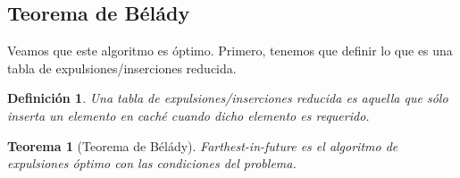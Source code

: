 \documentclass[a4paper, 11pt]{article} %
\newtheorem*{mydef}{Definición}
\newtheorem{theorem}{Teorema}
\begin{document}
  \subsection{Teorema de Bélády}
  Veamos que este algoritmo es óptimo.
  Primero, tenemos que definir lo que es una tabla de expulsiones/inserciones reducida.
  
  \begin{mydef}
    Una tabla de expulsiones/inserciones reducida es aquella que sólo inserta un elemento en caché cuando dicho elemento es requerido.
  \end{mydef}
  
  \begin{theorem}[Teorema de Bélády]
    Farthest-in-future es el algoritmo de expulsiones óptimo con las condiciones del problema.
  \end{theorem}
\end{document}

